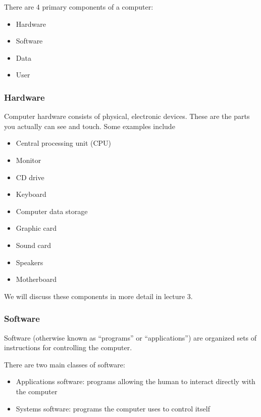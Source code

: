 \documentclass[letterpaper,10pt,english,openany,oneside]{sphinxmanual}
\begin{document}
There are 4 primary components of a computer:
\begin{itemize}
\item {} 
Hardware

\item {} 
Software

\item {} 
Data

\item {} 
User

\end{itemize}


\subsubsection{Hardware}
\label{\detokenize{introduction:hardware}}
Computer hardware consists of physical, electronic devices. These are the parts you actually can see and touch. Some examples include
\begin{itemize}
\item {} 
Central processing unit (CPU)

\item {} 
Monitor

\item {} 
CD drive

\item {} 
Keyboard

\item {} 
Computer data storage

\item {} 
Graphic card

\item {} 
Sound card

\item {} 
Speakers

\item {} 
Motherboard

\end{itemize}

We will discuss these components in more detail in lecture 3.


\subsubsection{Software}
\label{\detokenize{introduction:software}}
Software (otherwise known as “programs” or “applications”) are organized sets of instructions for controlling the computer.

There are two main classes of software:
\begin{itemize}
\item {} 
Applications software: programs allowing the human to interact directly with the computer

\item {} 
Systems software: programs the computer uses to control itself

\end{itemize}
\end{document}
